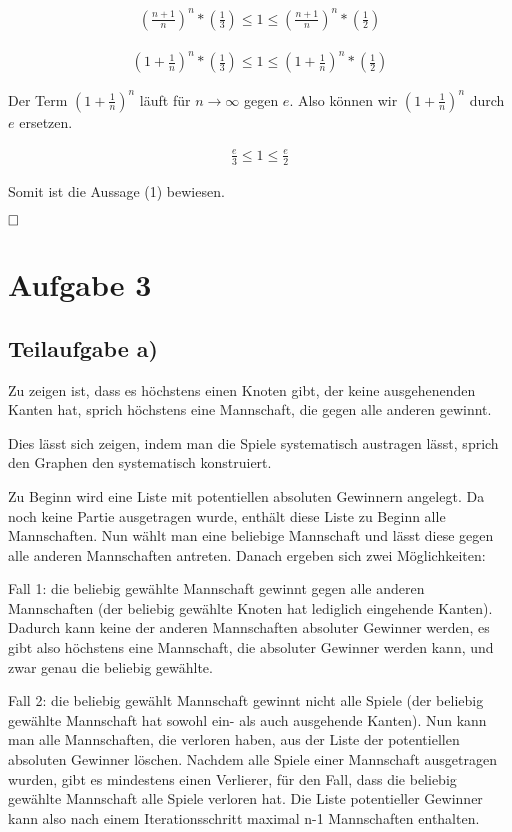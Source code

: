 \documentclass[12pt]{scrartcl}%
\theoremstyle{nonumberplain}
\begin{document}
\begin{align*}
	(\frac{n+1}{n})^{n} * (\frac{1}{3}) \le 1 \le (\frac{n+1}{n})^{n} * (\frac{1}{2})
\end{align*}

\begin{align*}
	(1 + \frac{1}{n})^{n} * (\frac{1}{3}) \le 1 \le (1 + \frac{1}{n})^{n} * (\frac{1}{2})
\end{align*}

Der Term $(1 + \frac{1}{n})^{n}$ läuft für $n \rightarrow \infty$ gegen $e$. Also können wir $(1 + \frac{1}{n})^{n}$ durch $e$ ersetzen.

\begin{align*}
	\frac{e}{3} \le 1 \le \frac{e}{2}
\end{align*}

Somit ist die Aussage (1) bewiesen.

$\hfill \square$

\newpage

\section*{Aufgabe 3}
\subsection*{Teilaufgabe a)}

Zu zeigen ist, dass es höchstens einen Knoten gibt, der keine ausgehenenden Kanten hat, sprich höchstens eine Mannschaft, die gegen alle anderen gewinnt.

Dies lässt sich zeigen, indem man die Spiele systematisch austragen lässt, sprich den Graphen den systematisch konstruiert.

Zu Beginn wird eine Liste mit potentiellen absoluten Gewinnern angelegt. Da noch keine Partie ausgetragen wurde, enthält diese Liste zu Beginn alle Mannschaften. Nun wählt man eine beliebige Mannschaft und lässt diese gegen alle anderen Mannschaften antreten. Danach ergeben sich zwei Möglichkeiten:

Fall 1: die beliebig gewählte Mannschaft gewinnt gegen alle anderen Mannschaften (der beliebig gewählte Knoten hat lediglich eingehende Kanten). Dadurch kann keine der anderen Mannschaften absoluter Gewinner werden, es gibt also höchstens eine Mannschaft, die absoluter Gewinner werden kann, und zwar genau die beliebig gewählte.

Fall 2: die beliebig gewählt Mannschaft gewinnt nicht alle Spiele (der beliebig gewählte Mannschaft hat sowohl ein- als auch ausgehende Kanten). Nun kann man alle Mannschaften, die verloren haben, aus der Liste der potentiellen absoluten Gewinner löschen. Nachdem alle Spiele einer Mannschaft ausgetragen wurden, gibt es mindestens einen Verlierer, für den Fall, dass die beliebig gewählte Mannschaft alle Spiele verloren hat. Die Liste potentieller Gewinner kann also nach einem Iterationsschritt maximal n-1 Mannschaften enthalten.
\end{document}
